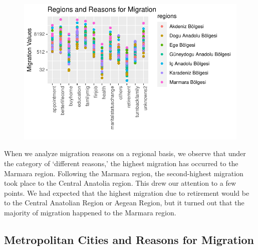 \documentclass[
  11pt,
  a4paper,
  DIV=11,
  numbers=noendperiod]{scrartcl}
\begin{document}
\begin{figure}[H]

{\centering \includegraphics{analysis_files/figure-pdf/unnamed-chunk-3-1.pdf}

}

\end{figure}

When we analyze migration reasons on a regional basis, we observe that
under the category of `different reasons,' the highest migration has
occurred to the Marmara region. Following the Marmara region, the
second-highest migration took place to the Central Anatolia region. This
drew our attention to a few points. We had expected that the highest
migration due to retirement would be to the Central Anatolian Region or
Aegean Region, but it turned out that the majority of migration happened
to the Marmara region.

\hypertarget{metropolitan-cities-and-reasons-for-migration}{%
\subsection{Metropolitan Cities and Reasons for
Migration}\label{metropolitan-cities-and-reasons-for-migration}}
\end{document}
